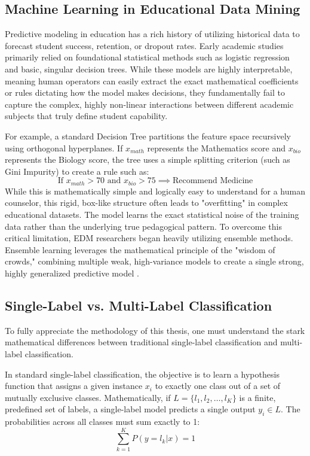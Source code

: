 \subsection{Machine Learning in Educational Data Mining}

Predictive modeling in education has a rich history of utilizing historical data to forecast student success, retention, or dropout rates. Early academic studies primarily relied on foundational statistical methods such as logistic regression and basic, singular decision trees. While these models are highly interpretable, meaning human operators can easily extract the exact mathematical coefficients or rules dictating how the model makes decisions, they fundamentally fail to capture the complex, highly non-linear interactions between different academic subjects that truly define student capability.

For example, a standard Decision Tree partitions the feature space recursively using orthogonal hyperplanes. If $x_{math}$ represents the Mathematics score and $x_{bio}$ represents the Biology score, the tree uses a simple splitting criterion (such as Gini Impurity) to create a rule such as:
\[
\text{If } x_{math} > 70 \text{ and } x_{bio} > 75 \implies \text{Recommend Medicine}
\]
While this is mathematically simple and logically easy to understand for a human counselor, this rigid, box-like structure often leads to "overfitting" in complex educational datasets. The model learns the exact statistical noise of the training data rather than the underlying true pedagogical pattern. To overcome this critical limitation, EDM researchers began heavily utilizing ensemble methods. Ensemble learning leverages the mathematical principle of the "wisdom of crowds," combining multiple weak, high-variance models to create a single strong, highly generalized predictive model \autocite{romero2010educational}.

\subsection{Single-Label vs. Multi-Label \parencite{tsoumakas2007multi} Classification}

To fully appreciate the methodology of this thesis, one must understand the stark mathematical differences between traditional single-label classification and multi-label \parencite{tsoumakas2007multi} classification.

In standard single-label classification, the objective is to learn a hypothesis function that assigns a given instance $x_i$ to exactly one class out of a set of mutually exclusive classes. Mathematically, if $L = \{l_1, l_2, \dots, l_K\}$ is a finite, predefined set of labels, a single-label model predicts a single output $y_i \in L$. The probabilities across all classes must sum exactly to 1:
\[
\sum_{k=1}^{K} P(y=l_k | x) = 1
\]

